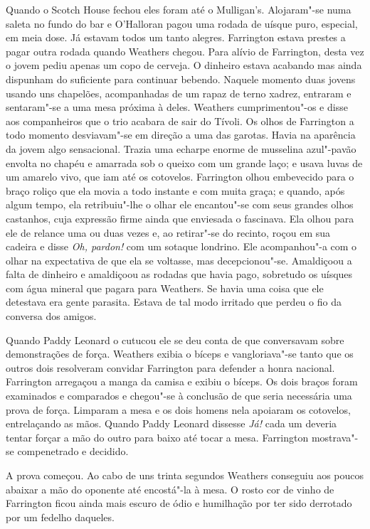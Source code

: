 Quando o Scotch House fechou eles foram até o Mulligan’s.  Alojaram"-se numa
saleta no fundo do bar e O’Halloran pagou uma rodada de uísque puro, especial,
em meia dose.  Já estavam todos um tanto alegres.  Farrington estava prestes a
pagar outra rodada quando Weathers chegou.  Para alívio de Farrington, desta
vez o jovem pediu apenas um copo de cerveja.  O dinheiro estava acabando mas
ainda dispunham do suficiente para continuar bebendo.  Naquele momento duas
jovens usando uns chapelões, acompanhadas de um rapaz de terno xadrez, entraram
e sentaram"-se a uma mesa próxima à deles.  Weathers cumprimentou"-os e disse aos
companheiros que o trio acabara de sair do Tívoli.  Os olhos de Farrington a
todo momento desviavam"-se em direção a uma das garotas.  Havia na aparência da
jovem algo sensacional.  Trazia uma echarpe enorme de musselina azul"-pavão
envolta no chapéu e amarrada sob o queixo com um grande laço; e usava luvas de
um amarelo vivo, que iam até os cotovelos.  Farrington olhou embevecido para o
braço roliço que ela movia a todo instante e com muita graça; e quando, após
algum tempo, ela retribuiu"-lhe o olhar ele encantou"-se com seus grandes olhos
castanhos, cuja expressão firme ainda que enviesada o fascinava.  Ela olhou
para ele de relance uma ou duas vezes e, ao retirar"-se do recinto, roçou em sua
cadeira e disse \textit{Oh, pardon!} com um sotaque londrino.  Ele acompanhou"-a
com o olhar na expectativa de que ela se voltasse, mas decepcionou"-se.
Amaldiçoou a falta de dinheiro e amaldiçoou as rodadas que havia pago,
sobretudo os uísques com água mineral que pagara para Weathers.  Se havia uma
coisa que ele detestava era gente parasita.  Estava de tal modo irritado que
perdeu o fio da conversa dos amigos.

Quando Paddy Leonard o cutucou ele se deu conta de que conversavam sobre
demonstrações de força.  Weathers exibia o bíceps e vangloriava"-se tanto que os
outros dois resolveram convidar Farrington para defender a honra nacional.
Farrington arregaçou a manga da camisa e exibiu o bíceps.  Os dois braços foram
examinados e comparados e chegou"-se à conclusão de que seria necessária uma
prova de força.  Limparam a mesa e os dois homens nela apoiaram os cotovelos,
entrelaçando as mãos.  Quando Paddy Leonard dissesse \textit{Já!} cada um
deveria tentar forçar a mão do outro para baixo até tocar a mesa.  Farrington
mostrava"-se compenetrado e decidido.

A prova começou.  Ao cabo de uns trinta segundos Weathers conseguiu aos poucos
abaixar a mão do oponente até encostá"-la à mesa.  O rosto cor de vinho de
Farrington ficou ainda mais escuro de ódio e humilhação por ter sido derrotado
por um fedelho daqueles.

